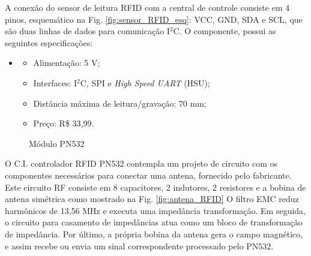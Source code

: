     A conexão do sensor de leitura RFID com a central de controle consiste em 4 pinos, esquemático na Fig. \ref{fig:sensor_RFID_esq}: VCC, GND, SDA e SCL, que são duas linhas de dados para comunicação I$^2$C. O componente, possui as seguintes especificações:
    
    \begin{itemize}
    \item[ ]
        \begin{itemize}
            \item Alimentação: 5 V;
            \item Interfaces: I$^2$C, SPI e \textit{High Speed UART} (HSU);
            \item Distância máxima de leitura/gravação: 70 mm;
            \item Preço: R\$ 33,99.
        \end{itemize}
    \end{itemize}
    
\begin{figure}[H]
    \centering
    \hspace{0.05\textwidth}
    \caption{Módulo PN532}\label{fig:modulo_RFID}
\end{figure}
    
    O C.I. controlador RFID PN532 contempla um projeto de circuito com os componentes necessários para conectar uma antena, fornecido pelo fabricante. Este circuito RF consiste em 8 capacitores, 2 indutores, 2 resistores e a bobina de antena simétrica como mostrado na Fig. \ref{fig:antena_RFID}
    O filtro EMC reduz harmônicos de 13,56 MHz e executa uma impedância transformação. Em seguida, o circuito para casamento de impedâncias atua como um bloco de transformação de impedância. Por último, a própria bobina da antena gera o campo magnético, e assim recebe ou envia um sinal correspondente processado pelo PN532.
    
